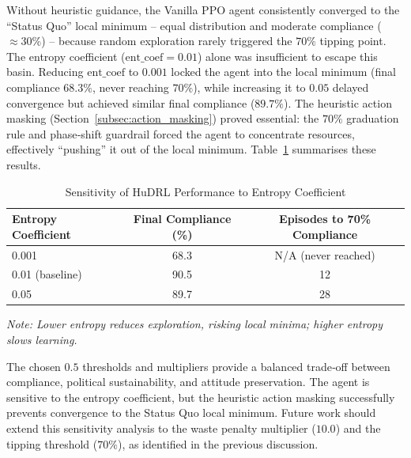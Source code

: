 Without heuristic guidance, the Vanilla PPO agent consistently converged to the “Status Quo” local minimum – equal distribution and moderate compliance (\(\approx30\%\)) – because random exploration rarely triggered the \(70\%\) tipping point. The entropy coefficient (\(\text{ent\_coef}=0.01\)) alone was insufficient to escape this basin. Reducing \(\text{ent\_coef}\) to \(0.001\) locked the agent into the local minimum (final compliance \(68.3\%\), never reaching \(70\%\)), while increasing it to \(0.05\) delayed convergence but achieved similar final compliance (\(89.7\%\)). The heuristic action masking (Section~\ref{subsec:action_masking}) proved essential: the \(70\%\) graduation rule and phase‑shift guardrail forced the agent to concentrate resources, effectively “pushing” it out of the local minimum. Table~\ref{tab:entropy_sensitivity} summarises these results.

\begin{table}[htbp]
\centering
\caption{Sensitivity of HuDRL Performance to Entropy Coefficient}
\label{tab:entropy_sensitivity}
\begin{tabular}{l c c}
\toprule
Entropy Coefficient & Final Compliance (\%) & Episodes to 70\% Compliance \\
\midrule
0.001 & 68.3 & N/A (never reached) \\
0.01 (baseline) & 90.5 & 12 \\
0.05 & 89.7 & 28 \\
\bottomrule
\end{tabular}
\vspace{0.2cm}
\footnotesize \textit{Note: Lower entropy reduces exploration, risking local minima; higher entropy slows learning.}
\end{table}

The chosen \(0.5\) thresholds and multipliers provide a balanced trade‑off between compliance, political sustainability, and attitude preservation. The agent is sensitive to the entropy coefficient, but the heuristic action masking successfully prevents convergence to the Status Quo local minimum. Future work should extend this sensitivity analysis to the waste penalty multiplier (\(10.0\)) and the tipping threshold (\(70\%\)), as identified in the previous discussion.

